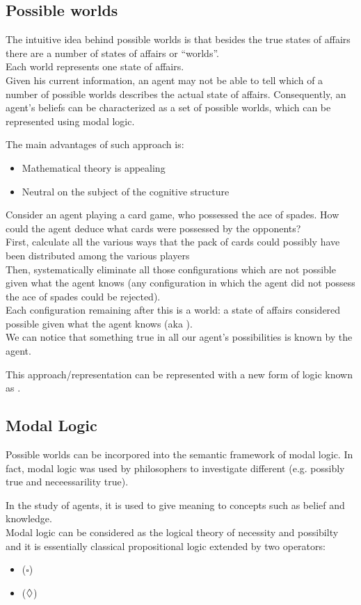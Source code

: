 \subsection{Possible worlds}
The intuitive idea behind possible worlds is that besides the true states of affairs there are a number of states of affairs or ``worlds''.\\
Each world represents one state of affairs.\\
Given his current information, an agent may not be able to tell which of a number of possible worlds describes the actual state of affairs. Consequently, an agent's beliefs can be characterized as a set of possible worlds, which can be represented using modal logic.

The main advantages of such approach is:
\begin{itemize}
\item Mathematical theory is appealing
\item Neutral on the subject of the cognitive structure
\end{itemize}

Consider an agent playing a card game, who possessed the ace of spades. How could the agent deduce what cards were possessed by the opponents?\\
First, calculate all the various ways that the pack of cards could possibly have been distributed among the various players\\
Then, systematically eliminate all those configurations which are not possible given what the agent knows (any configuration in which the agent did not possess the ace of spades could be rejected).\\
Each configuration remaining after this is a world: a state of affairs considered possible given what the agent knows (aka ).\\
We can notice that something true in all our agent's possibilities is known by the agent.

This approach/representation can be represented with a new form of logic known as .
\subsection{Modal Logic}
Possible worlds can be incorpored into the semantic framework of modal logic.
In fact, modal logic was used by philosophers to investigate different  (e.g. possibly true and neceessarility true).

In the study of agents, it is used to give meaning to concepts such as belief and knowledge.\\
Modal logic can be considered as the logical theory of necessity and possibilty and it is essentially classical propositional logic extended by two operators:
\begin{itemize}
\item {} ($\square$)
\item {} ($\mathbin{\Diamond}$)
\end{itemize}
 
